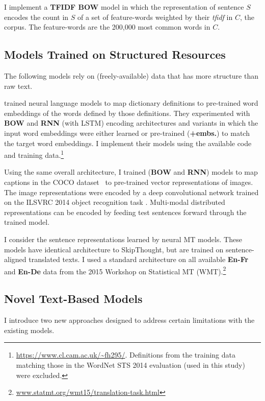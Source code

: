 \vspace{5pt} I implement a {\bf TFIDF BOW} model in which the representation of sentence \(S\) encodes the count in \(S\) of a set of feature-words weighted by their \emph{tfidf} in \(C\), the corpus. The feature-words are the 200,000 most common words in \(C\). 

\subsection{Models Trained on Structured Resources}
The following models rely on (freely-available) data that has more structure than raw text.

\vspace{5pt} \cite{hill2015learning} trained neural language models to map dictionary definitions to pre-trained word embeddings of the words defined by those definitions. They experimented with {\bf BOW} and {\bf RNN} (with LSTM) encoding architectures and variants in which the input word embeddings were either learned or pre-trained ({\bf+embs.}) to match the target word embeddings. I implement their models using the available code and training data.\footnote{{\scriptsize \url{https://www.cl.cam.ac.uk/~fh295/}}. Definitions from the training data matching those in the WordNet STS 2014 evaluation (used in this study) were excluded.}

\vspace{5pt} Using the same overall architecture, I trained ({\bf BOW} and {\bf RNN}) models to map captions in the COCO dataset~\citep{chen2015microsoft} to pre-trained vector representations of images. The image representations were encoded by a deep convolutional network \citep{szegedy2014going} trained on the ILSVRC 2014 object recognition task \citep{russakovsky2014imagenet}. Multi-modal distributed representations can be encoded by feeding test sentences forward through the trained model. 

\vspace{5pt} I consider the sentence representations learned by neural MT models. These models have identical architecture to SkipThought, but are trained on sentence-aligned translated texts. I used a standard architecture \citep{cho2014learning} on all available {\bf En-Fr} and {\bf En-De} data from the 2015 Workshop on Statistical MT (WMT).\footnote{\scriptsize \url{www.statmt.org/wmt15/translation-task.html}} 

\subsection{Novel Text-Based Models}
I introduce two new approaches designed to address certain limitations with the existing models.

